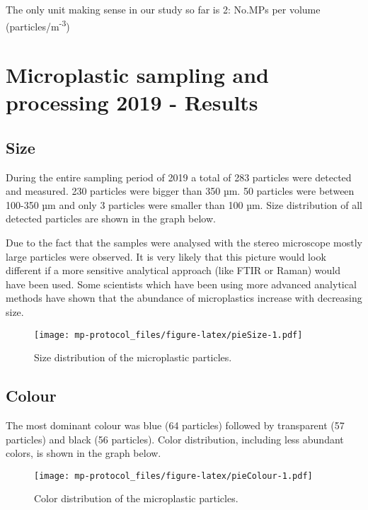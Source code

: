 \documentclass[
  icelandic,
]{book}
\begin{document}
The only unit making sense in our study so far is 2: No.MPs per volume (particles/m\textsuperscript{-3})

\hypertarget{microplastic-sampling-and-processing-2019---results}{%
\chapter{Microplastic sampling and processing 2019 - Results}\label{microplastic-sampling-and-processing-2019---results}}

\hypertarget{size}{%
\section{Size}\label{size}}

During the entire sampling period of 2019 a total of 283 particles were detected and measured. 230 particles were bigger than 350 µm. 50 particles were between 100-350 µm and only 3 particles were smaller than 100 µm. Size distribution of all detected particles are shown in the graph below.

Due to the fact that the samples were analysed with the stereo microscope mostly large particles were observed. It is very likely that this picture would look different if a more sensitive analytical approach (like FTIR or Raman) would have been used. Some scientists which have been using more advanced analytical methods have shown that the abundance of microplastics increase with decreasing size.

\begin{figure}
\centering
\texttt{[image: mp-protocol\_files/figure-latex/pieSize-1.pdf]}
\caption{\label{fig:pieSize}Size distribution of the microplastic particles.}
\end{figure}

\hypertarget{colour}{%
\section{Colour}\label{colour}}

The most dominant colour was blue (64 particles) followed by transparent (57 particles) and black (56 particles). Color distribution, including less abundant colors, is shown in the graph below.

\begin{figure}
\centering
\texttt{[image: mp-protocol\_files/figure-latex/pieColour-1.pdf]}
\caption{\label{fig:pieColour}Color distribution of the microplastic particles.}
\end{figure}
\end{document}
